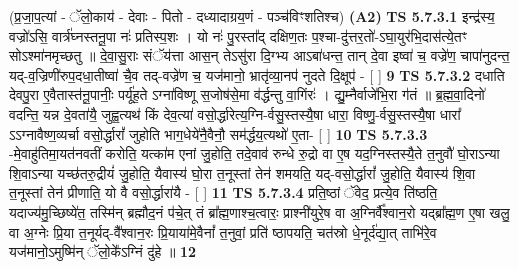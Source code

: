\documentclass[17pt]{extarticle}
\begin{document}
                  \newline
                      (प्र॒जा॒प॒त्यां - ॅलो॒काय॑ - देवाः - पितो - दध्यादाग्रय॒णं - पञ्च॑विꣳशतिश्च)  \textbf{(A2)} \newline \newline
                                        \textbf{ TS 5.7.3.1} \newline
                  इन्द्र॑स्य॒ वज्रो॑ऽसि॒ वार्त्र॑घ्नस्तनू॒पा नः॑ प्रतिस्प॒शः । यो नः॑ पु॒रस्ता᳚द् दक्षिण॒तः प॒श्चा-दु॑त्तर॒तो॑-ऽघा॒युर॑भि॒दास॑त्ये॒तꣳ सोऽश्मा॑नमृच्छतु ॥ दे॒वा॒सु॒राः संॅय॑त्ता आस॒न् तेऽसु॑रा दि॒ग्भ्य आऽबा॑धन्त॒ तान् दे॒वा इष्वा॑ च॒ वज्रे॑ण॒ चापा॑नुदन्त॒ यद्-व॒ज्रिणी॑रुप॒दधा॒तीष्वा॑ चै॒व तद्-वज्रे॑ण च॒ यज॑मानो॒ भ्रातृ॑व्या॒नप॑ नुदते दि॒क्षूप॑ - [  ] \textbf{  9} \newline
                  \newline
                                \textbf{ TS 5.7.3.2} \newline
                  दधाति देवपु॒रा ए॒वैतास्त॑नू॒पानीः॒ पर्यू॑ह॒ते ऽग्ना॑विष्णू स॒जोष॑से॒मा व॑र्द्धन्तु वा॒गिंरः॑ । द्यु॒म्नैर्वाजे॑भि॒रा ग॑तं ॥ ब्र॒ह्म॒वा॒दिनो॑ वदन्ति॒ यन्न दे॒वता॑यै॒ जुह्व॒त्यथ॑ किं देव॒त्या॑ वसो॒र्द्धारेत्य॒ग्नि-र्वसु॒स्तस्यै॒षा धारा॒ विष्णु॒-र्वसु॒स्तस्यै॒षा धारा᳚ ऽऽग्नावैष्ण॒व्यर्चा वसो॒र्द्धारां᳚ जुहोति भाग॒धेये॑नै॒वैनौ॒ सम॑र्द्धय॒त्यथो॑ ए॒ता- [  ] \textbf{  10} \newline
                  \newline
                                \textbf{ TS 5.7.3.3} \newline
                  -मे॒वाहु॑तिमा॒यत॑नवतीं करोति॒ यत्का॑म एनां जु॒होति॒ तदे॒वाव॑ रुन्धे रु॒द्रो वा ए॒ष यद॒ग्निस्तस्यै॒ते त॒नुवौ॑ घो॒राऽन्या शि॒वाऽन्या यच्छ॑तरु॒द्रीयं॑ जु॒होति॒ यैवास्य॑ घो॒रा त॒नूस्तां तेन॑ शमयति॒ यद्-वसो॒र्द्धारां᳚ जु॒होति॒ यैवास्य॑ शि॒वा त॒नूस्तां तेन॑ प्रीणाति॒ यो वै वसो॒र्द्धारा॑यै - [  ] \textbf{  11} \newline
                  \newline
                                \textbf{ TS 5.7.3.4} \newline
                  प्रति॒ष्ठां ॅवेद॒ प्रत्ये॒व ति॑ष्ठति॒ यदाज्य॑मु॒च्छिष्ये॑त॒ तस्मि॑न् ब्रह्मौद॒नं प॑चे॒त् तं ब्रा᳚ह्म॒णाश्च॒त्वारः॒ प्राश्नी॑युरे॒ष वा अ॒ग्निर्वै᳚श्वान॒रो यद्ब्रा᳚ह्म॒ण ए॒षा खलु॒ वा अ॒ग्नेः प्रि॒या त॒नूर्यद्-वै᳚श्वान॒रः प्रि॒याया॑मे॒वैनां᳚ त॒नुवां॒ प्रति॑ ष्ठापयति॒ चत॑स्रो धे॒नूर्द॑द्या॒त् ताभि॑रे॒व यज॑मानो॒ऽमुष्मि॑न् ॅलो॒के᳚ऽग्निं दु॑हे ॥ \textbf{  12} \newline
                  \newline
\end{document}
